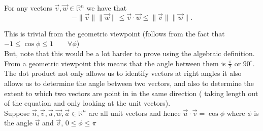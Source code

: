 \documentclass{report}
\begin{document}
  \begin{corollary}[]
  	For any vectors $ \vec{ v} ,\vec{ w} \in \mathbb{R} ^{n}$ we have that 
	\[
	- \|\vec{ v} \| \|\vec{ w} \| \leq \vec{ v} \cdot \vec{ w} \leq \|\vec{ v} \| \|\vec{ w} \|
	.\] 
  \end{corollary}
  This is trivial from the geometric viewpoint (follows from the fact that $ -1 \leq \cos \phi  \leq 1 \qquad  \forall  \phi $)\\
  But, note that this would be a lot harder to prove using the algebraic definition.\\

  From a geometric viewpoint this means that the angle between them is $\frac{\pi}{2} $ or $90^{\circ} $.\\
  The dot product not only allows us to identify vectors at right angles it also allows us to determine the angle between two vectors, and also to determine the extent to which two vectors are point in in the same direction ( taking length out of the equation and only looking at the unit vectors).\\
  Suppose $ \vec{ n} , \vec{ v} , \vec{ u } ,\vec{ w} , \vec{ a}  \in \mathbb{R} ^{n}$ are all unit vectors and hence $ \vec{ u} \cdot  \vec{ v} = \cos \phi $ where $\phi $ is the angle $ \vec{ u} $ and $ \vec{ v} $, $ 0 \leq \phi \leq \pi$ \\
  \\

   \
\end{document}
